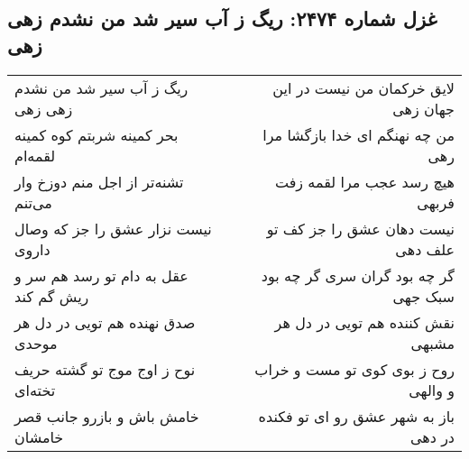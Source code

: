 \begin{center}
\section*{غزل شماره ۲۴۷۴: ریگ ز آب سیر شد من نشدم زهی زهی}
\label{sec:2474}
\begin{longtable}{l p{0.5cm} r}
ریگ ز آب سیر شد من نشدم زهی زهی
&&
لایق خرکمان من نیست در این جهان زهی
\\
بحر کمینه شربتم کوه کمینه لقمه‌ام
&&
من چه نهنگم ای خدا بازگشا مرا رهی
\\
تشنه‌تر از اجل منم دوزخ وار می‌تنم
&&
هیچ رسد عجب مرا لقمه زفت فربهی
\\
نیست نزار عشق را جز که وصال داروی
&&
نیست دهان عشق را جز کف تو علف دهی
\\
عقل به دام تو رسد هم سر و ریش گم کند
&&
گر چه بود گران سری گر چه بود سبک جهی
\\
صدق نهنده هم تویی در دل هر موحدی
&&
نقش کننده هم تویی در دل هر مشبهی
\\
نوح ز اوج موج تو گشته حریف تخته‌ای
&&
روح ز بوی کوی تو مست و خراب و والهی
\\
خامش باش و بازرو جانب قصر خامشان
&&
باز به شهر عشق رو ای تو فکنده در دهی
\\
\end{longtable}
\end{center}
